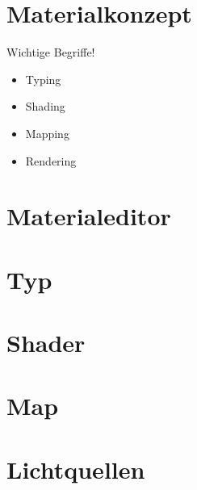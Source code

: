 
\section{Materialkonzept}
Wichtige Begriffe!
\begin{itemize}
\item Typing
\item Shading
\item Mapping
\item Rendering
\end{itemize}


\section{Materialeditor}

\section{Typ}

\section{Shader}


\section{Map}

\section{Lichtquellen}
